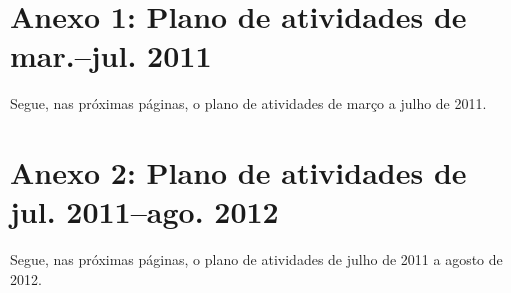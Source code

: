 \chapter*{Anexo 1: Plano de atividades de mar.--jul. 2011}

  Segue, nas próximas páginas, o plano de atividades de março a julho de 2011.
  

\chapter*{Anexo 2: Plano de atividades de jul. 2011--ago. 2012}

  Segue, nas próximas páginas, o plano de atividades de julho de 2011 a agosto
  de 2012.
  

